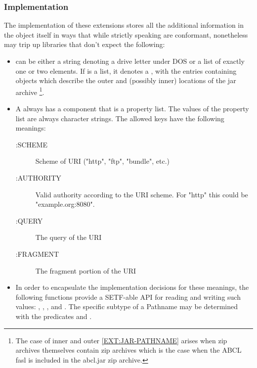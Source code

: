 \documentclass[10pt]{book}
\begin{document}
\subsubsection{Implementation}

The implementation of these extensions stores all the additional
information in the  object itself in ways that while strictly
speaking are conformant, nonetheless may trip up libraries that don't
expect the following:

\begin{itemize}
\item {} can be either a string denoting a drive letter
  under \textsc{DOS} or a list of exactly one or two elements.  If
   is a list, it denotes a , with
  the entries containing  objects which describe the
  outer and (possibly inner) locations of the jar
  archive \footnote{The case of inner and outer
     \ref{EXT:JAR-PATHNAME} arises when zip
    archives themselves contain zip archives which is the case when
    the ABCL fasl is included in the abcl.jar zip archive.}.

\item A  always has a  component that is a
  property list.  The values of the  property list are
  always character strings.  The allowed keys have the following meanings:
  \begin{description}
  \item[:SCHEME] Scheme of URI ("http", "ftp", "bundle", etc.)
  \item[:AUTHORITY] Valid authority according to the URI scheme.  For
    "http" this could be "example.org:8080". 
  \item[:QUERY] The query of the \textsc{URI} 
  \item[:FRAGMENT] The fragment portion of the \textsc{URI}
  \end{description}

\item In order to encapsulate the implementation decisions for these
  meanings, the following functions provide a SETF-able API for
  reading and writing such values: ,
  , , and
  .  The specific subtype of a Pathname may
  be determined with the predicates  and
  .

\label{EXTENSIONS:URL-PATHNAME-SCHEME}

\label{EXTENSIONS:URL-PATHNAME-FRAGMENT}

\label{EXTENSIONS:URL-PATHNAME-AUTHORITY}

\label{EXTENSIONS:PATHNAME-URL-P}

\label{EXTENSIONS:URL-PATHNAME-QUERY}

\end{itemize}
\end{document}
